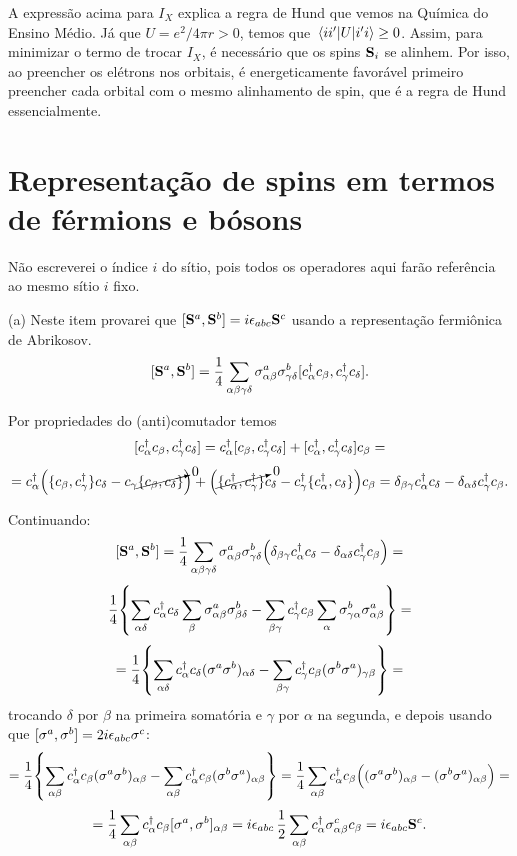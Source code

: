 \documentclass[a4paper,10pt]{article}
\begin{document}
A expressão acima para $I_X$ explica a regra de Hund que vemos na Química do Ensino Médio. Já que $U = e^2 / 4 \pi r > 0$, temos que $\mel{ii'}{U}{i'i} \geq 0$. Assim, para minimizar o termo de trocar $I_X$, é necessário que os spins $\vb{S}_i$ se alinhem. Por isso, ao preencher os elétrons nos orbitais, é energeticamente favorável primeiro preencher cada orbital com o mesmo alinhamento de spin, que é a regra de Hund essencialmente.


\pagebreak



\section{Representação de spins em termos de férmions e bósons}

Não escreverei o índice $i$ do sítio, pois todos os operadores aqui farão referência ao mesmo sítio $i$ fixo.

\n

(a) Neste item provarei que $[ \vb{S}^a, \vb{S}^b ] = i \epsilon_{abc} \vb{S}^c$ usando a representação fermiônica de Abrikosov.
$$
[ \vb{S}^a, \vb{S}^b ] =
\frac{1}{4} \sum_{\alpha \beta \gamma \delta}
\sigma^a_{\alpha \beta} \sigma^b_{\gamma \delta}
[ c_\alpha^\dagger c_\beta, c_\gamma^\dagger c_\delta ].
$$

Por propriedades do (anti)comutador temos
$$
[ c_\alpha^\dagger c_\beta, c_\gamma^\dagger c_\delta ] =
c_\alpha^\dagger [ c_\beta, c_\gamma^\dagger c_\delta ] +
[ c_\alpha^\dagger , c_\gamma^\dagger c_\delta ] c_\beta =
$$
$$
= c_\alpha^\dagger \Big( \{ c_\beta, c_\gamma^\dagger \} c_\delta -
c_\gamma \cancelto{0}{\{c_\beta, c_\delta\}} \Big) +
\Big( \cancelto{0}{\{ c_\alpha^\dagger , c_\gamma^\dagger \}} c_\delta -
c_\gamma^\dagger \{c_\alpha^\dagger, c_\delta\} \Big) c_\beta =
\delta_{\beta \gamma} c_\alpha^\dagger c_\delta -
\delta_{\alpha\delta} c_\gamma^\dagger c_\beta.
$$

Continuando:
$$
[ \vb{S}^a, \vb{S}^b ] =
\frac{1}{4} \sum_{\alpha \beta \gamma \delta}
\sigma^a_{\alpha \beta} \sigma^b_{\gamma \delta}
\Big( \delta_{\beta \gamma} c_\alpha^\dagger c_\delta -
\delta_{\alpha\delta} c_\gamma^\dagger c_\beta \Big) =
$$
$$
\frac{1}{4} \qty{ \sum_{\alpha \delta} c_\alpha^\dagger c_\delta
\sum_{\beta} \sigma^a_{\alpha \beta} \sigma^b_{\beta \delta}
-
\sum_{\beta \gamma} c_\gamma^\dagger c_\beta
\sum_{\alpha} \sigma^b_{\gamma \alpha} \sigma^a_{\alpha \beta}
} =
$$
$$
= \frac{1}{4} \qty{ \sum_{\alpha \delta} c_\alpha^\dagger c_\delta
(\sigma^a \sigma^b)_{\alpha \delta}
-
\sum_{\beta \gamma} c_\gamma^\dagger c_\beta
(\sigma^b \sigma^a)_{\gamma \beta}
} =
$$
trocando $\delta$ por $\beta$ na primeira somatória e $\gamma$ por $\alpha$ na segunda, e depois usando que $[\sigma^a, \sigma^b] = 2i \epsilon_{abc} \sigma^c$:
$$
= \frac{1}{4} \qty{ \sum_{\alpha \beta} c_\alpha^\dagger c_\beta
(\sigma^a \sigma^b)_{\alpha \beta}
-
\sum_{\alpha \beta} c_\alpha^\dagger c_\beta
(\sigma^b \sigma^a)_{\alpha \beta}
} =
\frac{1}{4} \sum_{\alpha \beta} c_\alpha^\dagger c_\beta
\Big(
(\sigma^a \sigma^b)_{\alpha \beta}
-
(\sigma^b \sigma^a)_{\alpha \beta} \Big) =
$$
$$
= \frac{1}{4} \sum_{\alpha \beta} c_\alpha^\dagger c_\beta
[\sigma^a , \sigma^b]_{\alpha \beta} =
i \epsilon_{abc} \, \frac{1}{2} \sum_{\alpha \beta}
c_\alpha^\dagger \sigma^c_{\alpha \beta} c_\beta = i \epsilon_{abc} \vb{S}^c.
$$
\end{document}
